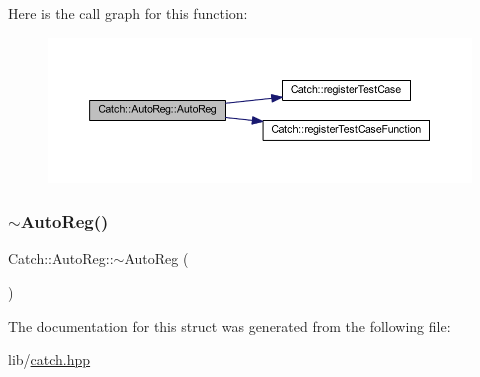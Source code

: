 Here is the call graph for this function\+:\nopagebreak
\begin{figure}[H]
\begin{center}
\leavevmode
\includegraphics[width=350pt]{struct_catch_1_1_auto_reg_a1bf9207fe0a02b46dc0ab1cc03cbe738_cgraph}
\end{center}
\end{figure}
\hypertarget{struct_catch_1_1_auto_reg_a3cdb53f1e5ff115310f3372bebe198f1}{}\label{struct_catch_1_1_auto_reg_a3cdb53f1e5ff115310f3372bebe198f1} 
\subsubsection{\texorpdfstring{$\sim$\+Auto\+Reg()}{~AutoReg()}}
{\footnotesize\ttfamily Catch\+::\+Auto\+Reg\+::$\sim$\+Auto\+Reg (\begin{DoxyParamCaption}{ }\end{DoxyParamCaption})}



The documentation for this struct was generated from the following file\+:\begin{DoxyCompactItemize}
\item 
lib/\hyperlink{catch_8hpp}{catch.\+hpp}\end{DoxyCompactItemize}

